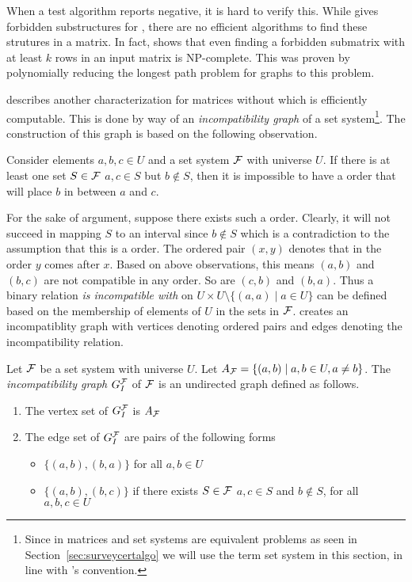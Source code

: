 When a \COP test algorithm reports negative, it is hard to verify
this. While \cite{at72} gives forbidden substructures for \COP, there
are no efficient algorithms to find these strutures in a matrix. In
fact, \cite{v82} shows that even finding a forbidden submatrix with at
least $k$ rows in an input matrix is NP-complete. This was proven by
polynomially reducing the longest path problem for graphs to this
problem.

\cite{mcc04} describes another characterization for matrices without
\COP which is efficiently computable. This is done by way of an {\em
  incompatibility graph} of a set system\footnote{Since \COP in
  matrices and set systems are equivalent problems as seen in
  Section~\ref{sec:surveycertalgo} we will use the term set system in
  this section, in line with \cite{mcc04}'s convention.}. The
construction of this graph is based on the following observation.

\begin{observation} 
  Consider elements $a, b, c \in U$ and a set system ${\cal F}$ with
  universe $U$. If there is at least one set $S \in {\cal F}$ \stt $a, c
  \in S$ but $b \notin S$, then it is impossible to have a \COP order
  that will place $b$ in between $a$ and $c$. 
\end{observation}

For the sake of argument, suppose there exists such a \COP
order. Clearly, it will not succeed in mapping $S$ to an interval
since $b \notin S$ which is a contradiction to the assumption that
this is a \COP order.  The ordered pair $(x,y)$ denotes that in the
\COP order $y$ comes after $x$. Based on above observations, this
means $(a,b)$ and $(b,c)$ are not compatible in any \COP order. So are
$(c,b)$ and $(b,a)$.  Thus a binary relation {\em is incompatible
  with} on $U \times U \setminus \{(a,a) \mid a \in U\}$ can be
defined based on the membership of elements of $U$ in the sets in
${\cal F}$.  \cite{mcc04} creates an incompatiblity graph with vertices
denoting ordered pairs and edges denoting the incompatibility
relation.

\begin{definition}
  Let ${\cal F}$ be a set system with universe $U$. Let $A_{{\cal F}} = \{(a,b)
  \mid a, b \in U, a \ne b\}$. The {\em incompatibility graph}
  $G_I^{\cal F}$ of ${\cal F}$ is an undirected graph defined as follows.
  \begin{enumerate}
  \item   The vertex set of $G_I^{\cal F}$ is $ A_{{\cal F}}$
  \item  The edge set of $G_I^{\cal F}$ are pairs of the following forms
    \begin{itemize}
    \item $\{(a,b),(b,a)\}$ for all $a, b \in U$
    \item $\{(a,b),(b,c)\}$ if there exists $S \in {\cal F}$ \stt $a, c
      \in S$ and $b \notin S$, for all $a, b, c \in U$
    \end{itemize}
  \end{enumerate}
  \dstop
\end{definition}

